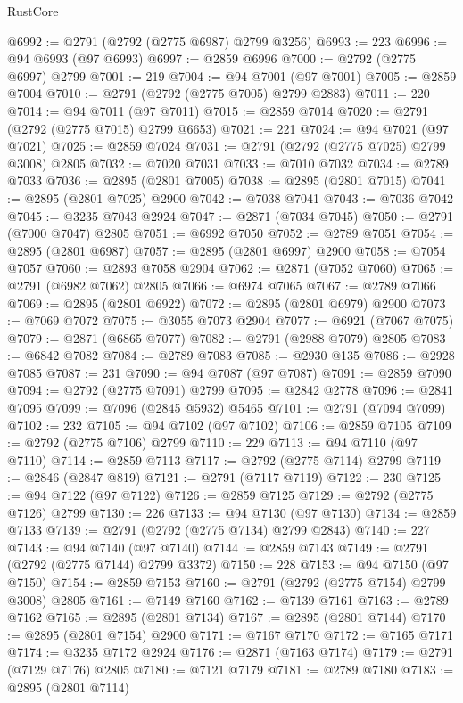 \begin{lexlean}{RustCore}
\begin{coremodule}
@6992 := @2791 (@2792 (@2775 @6987) @2799 @3256)
@6993 := 223
@6996 := @94 @6993 (@97 @6993)
@6997 := @2859 @6996
@7000 := @2792 (@2775 @6997) @2799
@7001 := 219
@7004 := @94 @7001 (@97 @7001)
@7005 := @2859 @7004
@7010 := @2791 (@2792 (@2775 @7005) @2799 @2883)
@7011 := 220
@7014 := @94 @7011 (@97 @7011)
@7015 := @2859 @7014
@7020 := @2791 (@2792 (@2775 @7015) @2799 @6653)
@7021 := 221
@7024 := @94 @7021 (@97 @7021)
@7025 := @2859 @7024
@7031 := @2791 (@2792 (@2775 @7025) @2799 @3008) @2805
@7032 := @7020 @7031
@7033 := @7010 @7032
@7034 := @2789 @7033
@7036 := @2895 (@2801 @7005)
@7038 := @2895 (@2801 @7015)
@7041 := @2895 (@2801 @7025) @2900
@7042 := @7038 @7041
@7043 := @7036 @7042
@7045 := @3235 @7043 @2924
@7047 := @2871 (@7034 @7045)
@7050 := @2791 (@7000 @7047) @2805
@7051 := @6992 @7050
@7052 := @2789 @7051
@7054 := @2895 (@2801 @6987)
@7057 := @2895 (@2801 @6997) @2900
@7058 := @7054 @7057
@7060 := @2893 @7058 @2904
@7062 := @2871 (@7052 @7060)
@7065 := @2791 (@6982 @7062) @2805
@7066 := @6974 @7065
@7067 := @2789 @7066
@7069 := @2895 (@2801 @6922)
@7072 := @2895 (@2801 @6979) @2900
@7073 := @7069 @7072
@7075 := @3055 @7073 @2904
@7077 := @6921 (@7067 @7075)
@7079 := @2871 (@6865 @7077)
@7082 := @2791 (@2988 @7079) @2805
@7083 := @6842 @7082
@7084 := @2789 @7083
@7085 := @2930 @135
@7086 := @2928 @7085
@7087 := 231
@7090 := @94 @7087 (@97 @7087)
@7091 := @2859 @7090
@7094 := @2792 (@2775 @7091) @2799
@7095 := @2842 @2778
@7096 := @2841 @7095
@7099 := @7096 (@2845 @5932) @5465
@7101 := @2791 (@7094 @7099)
@7102 := 232
@7105 := @94 @7102 (@97 @7102)
@7106 := @2859 @7105
@7109 := @2792 (@2775 @7106) @2799
@7110 := 229
@7113 := @94 @7110 (@97 @7110)
@7114 := @2859 @7113
@7117 := @2792 (@2775 @7114) @2799
@7119 := @2846 (@2847 @819)
@7121 := @2791 (@7117 @7119)
@7122 := 230
@7125 := @94 @7122 (@97 @7122)
@7126 := @2859 @7125
@7129 := @2792 (@2775 @7126) @2799
@7130 := 226
@7133 := @94 @7130 (@97 @7130)
@7134 := @2859 @7133
@7139 := @2791 (@2792 (@2775 @7134) @2799 @2843)
@7140 := 227
@7143 := @94 @7140 (@97 @7140)
@7144 := @2859 @7143
@7149 := @2791 (@2792 (@2775 @7144) @2799 @3372)
@7150 := 228
@7153 := @94 @7150 (@97 @7150)
@7154 := @2859 @7153
@7160 := @2791 (@2792 (@2775 @7154) @2799 @3008) @2805
@7161 := @7149 @7160
@7162 := @7139 @7161
@7163 := @2789 @7162
@7165 := @2895 (@2801 @7134)
@7167 := @2895 (@2801 @7144)
@7170 := @2895 (@2801 @7154) @2900
@7171 := @7167 @7170
@7172 := @7165 @7171
@7174 := @3235 @7172 @2924
@7176 := @2871 (@7163 @7174)
@7179 := @2791 (@7129 @7176) @2805
@7180 := @7121 @7179
@7181 := @2789 @7180
@7183 := @2895 (@2801 @7114)

\end{coremodule}
\end{lexlean}
